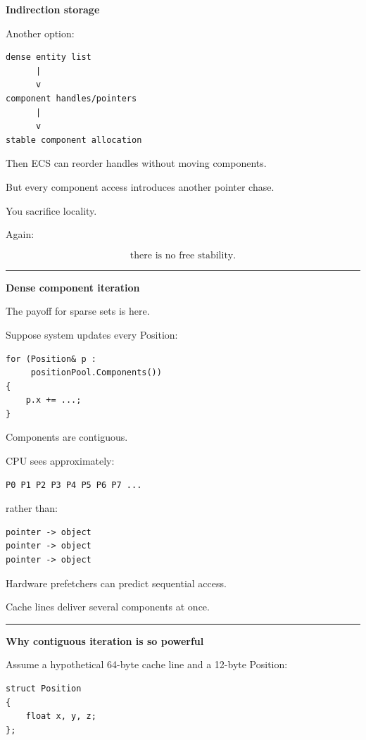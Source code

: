 \textbf{Indirection storage}

Another option:

\begin{verbatim}
dense entity list
      |
      v
component handles/pointers
      |
      v
stable component allocation
\end{verbatim}

Then ECS can reorder handles without moving components.

But every component access introduces another pointer chase.

You sacrifice locality.

Again:

\[
\boxed{
\text{there is no free stability}.
}
\]

\begin{center}\rule{0.5\linewidth}{0.5pt}\end{center}

\textbf{Dense component iteration}

The payoff for sparse sets is here.

Suppose system updates every Position:

\begin{verbatim}
for (Position& p :
     positionPool.Components())
{
    p.x += ...;
}
\end{verbatim}

Components are contiguous.

CPU sees approximately:

\begin{verbatim}
P0 P1 P2 P3 P4 P5 P6 P7 ...
\end{verbatim}

rather than:

\begin{verbatim}
pointer -> object
pointer -> object
pointer -> object
\end{verbatim}

Hardware prefetchers can predict sequential access.

Cache lines deliver several components at once.

\begin{center}\rule{0.5\linewidth}{0.5pt}\end{center}

\textbf{Why contiguous iteration is so powerful}

Assume a hypothetical 64-byte cache line and a 12-byte Position:

\begin{verbatim}
struct Position
{
    float x, y, z;
};
\end{verbatim}


